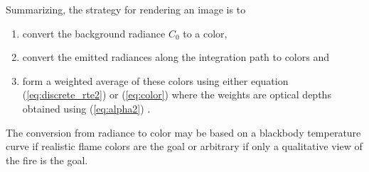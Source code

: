 Summarizing, the strategy for rendering an image is to
\begin{enumerate}
\item convert the background radiance $C_0$ to a color,

\item convert the emitted radiances along the integration path to
colors and

\item form a weighted average of these colors using either
equation (\ref{eq:discrete_rte2}) or (\ref{eq:color}) where the
weights are optical depths obtained using (\ref{eq:alpha2}) .

\end{enumerate}
The conversion from radiance to color may be based on a blackbody
temperature curve if realistic flame colors are the goal or
arbitrary if only a qualitative view of the fire is the goal.
